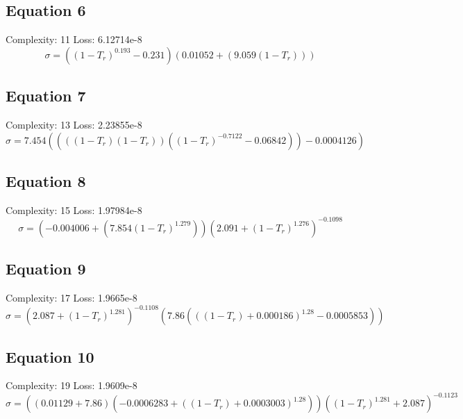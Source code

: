 \documentclass[11pt]{article}
\begin{document}
\subsection*{Equation 6}
\noindent Complexity: 11 \quad Loss: 6.12714e-8 \\[4pt]
\[
\sigma = (\left(1 - T_r\right)^{0.193} - 0.231) (0.01052 + (9.059 (1 - T_r)))
\]

\subsection*{Equation 7}
\noindent Complexity: 13 \quad Loss: 2.23855e-8 \\[4pt]
\[
\sigma = 7.454 ((((1 - T_r) (1 - T_r)) (\left(1 - T_r\right)^{-0.7122} - 0.06842)) - 0.0004126)
\]

\subsection*{Equation 8}
\noindent Complexity: 15 \quad Loss: 1.97984e-8 \\[4pt]
\[
\sigma = (-0.004006 + (7.854 \left(1 - T_r\right)^{1.279})) \left(2.091 + \left(1 - T_r\right)^{1.276}\right)^{-0.1098}
\]

\subsection*{Equation 9}
\noindent Complexity: 17 \quad Loss: 1.9665e-8 \\[4pt]
\[
\sigma = \left(2.087 + \left(1 - T_r\right)^{1.281}\right)^{-0.1108} (7.86 (\left((1 - T_r) + 0.000186\right)^{1.28} - 0.0005853))
\]

\subsection*{Equation 10}
\noindent Complexity: 19 \quad Loss: 1.9609e-8 \\[4pt]
\[
\sigma = ((0.01129 + 7.86) (-0.0006283 + \left((1 - T_r) + 0.0003003\right)^{1.28})) \left(\left(1 - T_r\right)^{1.281} + 2.087\right)^{-0.1123}
\]
\end{document}
